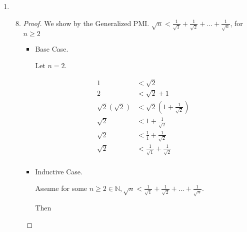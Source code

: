\documentclass[12pt,letterpaper]{article}
\begin{document}
\begin{enumerate}
\begin{enumerate}
\begin{enumerate}
\begin{proof}
\begin{itemize}
                  \item
                    From the Base case and the inductive case,
                    we use the PMI to state $\frac{n^3}{3} + \frac{n^5}{5} + \frac{7n}{15} \in \mathbb{N}, \forall n \in \mathbb{N}$
                \end{itemize}
              \end{proof}
          \end{enumerate}
        \item
          \begin{enumerate}
            \setcounter{enumiii}{7}
            \item
              \begin{proof}
                We show by the Generalized PMI.
                $\sqrt{n} < \frac{1}{\sqrt{1}} + \frac{1}{\sqrt{2}} + \dots + \frac{1}{\sqrt{n}}$, for $n \geq 2$
                \begin{itemize}
                  \item Base Case.

                    Let $n = 2$.

                    \begin{align*}
                      1 &< \sqrt{2} \\
                      2 &< \sqrt{2} + 1 \\
                      \sqrt{2}\left(\sqrt{2}\right) &< \sqrt{2}\left(1 + \frac{1}{\sqrt{2}}\right) \\
                      \sqrt{2} &< 1 + \frac{1}{\sqrt{2}} \\
                      \sqrt{2} &< \frac{1}{1} + \frac{1}{\sqrt{2}} \\
                      \sqrt{2} &< \frac{1}{\sqrt{1}} + \frac{1}{\sqrt{2}} \\
                    \end{align*}
                  \item Inductive Case.

                    Assume for some $n \geq 2 \in \mathbb{N}, \sqrt{n} < \frac{1}{\sqrt{1}} + \frac{1}{\sqrt{2}} + \dots + \frac{1}{\sqrt{n}}$.

                    Then


\end{itemize}
\end{proof}
\end{enumerate}
\end{enumerate}
\end{enumerate}
\end{document}
